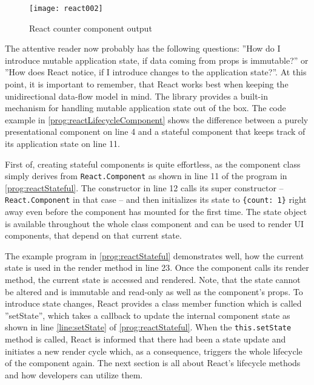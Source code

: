 \begin{figure}
  \centering
  \texttt{[image: react002]}
  \caption{React counter component output}
  \label{fig:reactCounterComponent}
\end{figure}

The attentive reader now probably has the following questions: ''How do I introduce mutable application state, if data coming from props is immutable?'' or ''How does React notice, if I introduce changes to the application state?''. At this point, it is important to remember, that React works best when keeping the unidirectional data-flow model in mind. The library provides a built-in mechanism for handling mutable application state out of the box. The code example in \ref{prog:reactLifecycleComponent} shows the difference between a purely presentational component on line 4 and a stateful component that keeps track of its application state on line 11.

First of, creating stateful components is quite effortless, as the component class simply derives from \texttt{React.Component} as shown in line 11 of the program in \ref{prog:reactStateful}. The constructor in line 12 calls its super constructor -- \texttt{React.Component} in that case -- and then initializes its state to \texttt{\{count: 1\}} right away even before the component has mounted for the first time. The state object is available throughout the whole class component and can be used to render UI components, that depend on that current state.

The example program in \ref{prog:reactStateful} demonstrates well, how the current state is used in the render method in line 23. Once the component calls its render method, the current state is accessed and rendered. Note, that the state cannot be altered and is immutable and read-only as well as the component's props. To introduce state changes, React provides a class member function which is called ''setState'', which takes a callback to update the internal component state as shown in line \ref{line:setState} of \ref{prog:reactStateful}. When the \texttt{this.setState} method is called, React is informed that there had been a state update and initiates a new render cycle which, as a consequence, triggers the whole lifecycle of the component again. The next section is all about React's lifecycle methods and how developers can utilize them.




